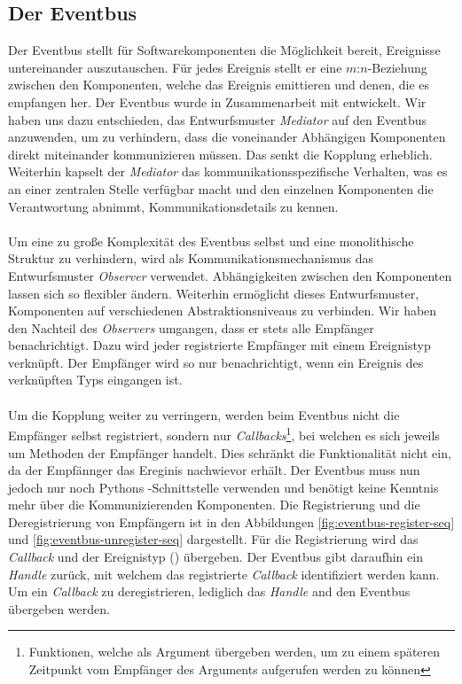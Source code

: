 \subsection{Der Eventbus}

Der Eventbus stellt für Softwarekomponenten die Möglichkeit bereit, Ereignisse untereinander auszutauschen. Für jedes Ereignis stellt er eine $m$:$n$-Beziehung zwischen den Komponenten, welche das Ereignis emittieren und denen, die es empfangen her. Der Eventbus wurde in Zusammenarbeit mit \citeauthor{persitzky_fehlerinjektion_2023} entwickelt. Wir haben uns dazu entschieden, das Entwurfsmuster \emph{Mediator} auf den Eventbus anzuwenden, um zu verhindern, dass die voneinander Abhängigen Komponenten direkt miteinander kommunizieren müssen. Das senkt die Kopplung erheblich. Weiterhin kapselt der \emph{Mediator} das kommunikationsspezifische Verhalten, was es an einer zentralen Stelle verfügbar macht und den einzelnen Komponenten die Verantwortung abnimmt, Kommunikationsdetails zu kennen.\\
\\
Um eine zu große Komplexität des Eventbus selbst und eine monolithische Struktur zu verhindern, wird als Kommunikationsmechanismus das Entwurfsmuster \emph{Observer} verwendet. Abhängigkeiten zwischen den Komponenten lassen sich so flexibler ändern. Weiterhin ermöglicht dieses Entwurfsmuster, Komponenten auf verschiedenen Abstraktionsniveaus zu verbinden. Wir haben den Nachteil des \emph{Observers} umgangen, dass er stets alle Empfänger benachrichtigt. Dazu wird jeder registrierte Empfänger mit einem Ereignistyp verknüpft. Der Empfänger wird so nur benachrichtigt, wenn ein Ereignis des verknüpften Typs eingangen ist.\\
\\
Um die Kopplung weiter zu verringern, werden beim Eventbus nicht die Empfänger selbst registriert, sondern nur \emph{Callbacks}\footnote{Funktionen, welche als Argument übergeben werden, um zu einem späteren Zeitpunkt vom Empfänger des Arguments aufgerufen werden zu können}, bei welchen es sich jeweils um Methoden der Empfänger handelt. Dies schränkt die Funktionalität nicht ein, da der Empfännger das Ereginis nachwievor erhält. Der Eventbus muss nun jedoch nur noch Pythons -Schnittstelle verwenden und benötigt keine Kenntnis mehr über die Kommunizierenden Komponenten. Die Registrierung und die Deregistrierung von Empfängern ist in den Abbildungen \ref{fig:eventbus-register-seq} und \ref{fig:eventbus-unregister-seq} dargestellt. Für die Registrierung wird das \emph{Callback} und der Ereignistyp () übergeben. Der Eventbus gibt daraufhin ein \emph{Handle} zurück, mit welchem das registrierte \emph{Callback} identifiziert werden kann. Um ein \emph{Callback} zu deregistrieren, lediglich das \emph{Handle} and den Eventbus übergeben werden.

